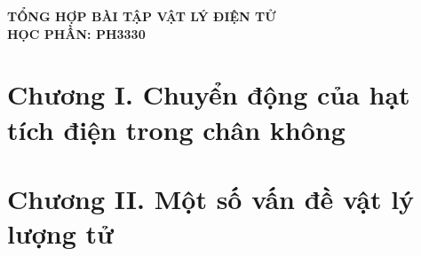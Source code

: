 \documentclass[11pt,a4paper]{article}
\begin{document}
\begin{center}
    {\Large\bfseries TỔNG HỢP BÀI TẬP VẬT LÝ ĐIỆN TỬ}\\[0.2cm]
    {\bfseries HỌC PHẦN: PH3330}
\end{center}
\vspace{0.2cm}


\section*{Chương I. Chuyển động của hạt tích điện trong chân không}


\vspace{0.35cm}


\vspace{0.35cm}


\vspace{0.35cm}


\vspace{0.35cm}




\clearpage
\section*{Chương II. Một số vấn đề vật lý lượng tử}


\vspace{0.35cm}


\vspace{0.35cm}


\vspace{0.35cm}


\vspace{0.35cm}


\vspace{0.35cm}
\end{document}
